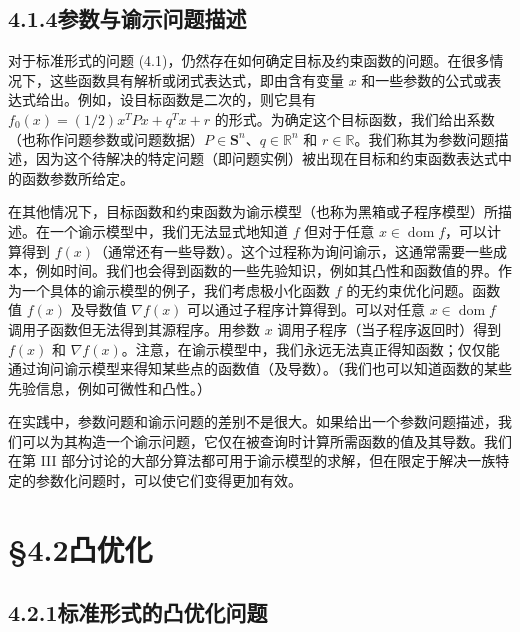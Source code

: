 \documentclass[UTF8, 12pt, fontset=fandol, oneside]{ctexart}
\begin{document}
\subsection*{4.1.4\quad 参数与谕示问题描述}

对于标准形式的问题 (4.1)，仍然存在如何确定目标及约束函数的问题。在很多情况下，这些函数具有解析或闭式表达式，即由含有变量 $x$ 和一些参数的公式或表达式给出。例如，设目标函数是二次的，则它具有 $f_0(x)=(1/2)x^TPx+q^Tx+r$ 的形式。为确定这个目标函数，我们给出系数（也称作问题参数或问题数据）$P\in\mathbf{S}^n$、$q\in\mathbb{R}^n$ 和 $r\in\mathbb{R}$。我们称其为参数问题描述，因为这个待解决的特定问题（即问题实例）被出现在目标和约束函数表达式中的函数参数所给定。

在其他情况下，目标函数和约束函数为谕示模型（也称为黑箱或子程序模型）所描述。在一个谕示模型中，我们无法显式地知道 $f$ 但对于任意 $x\in\operatorname{dom} f$，可以计算得到 $f(x)$（通常还有一些导数）。这个过程称为询问谕示，这通常需要一些成本，例如时间。我们也会得到函数的一些先验知识，例如其凸性和函数值的界。作为一个具体的谕示模型的例子，我们考虑极小化函数 $f$ 的无约束优化问题。函数值 $f(x)$ 及导数值 $\nabla f(x)$ 可以通过子程序计算得到。可以对任意 $x\in\operatorname{dom} f$ 调用子函数但无法得到其源程序。用参数 $x$ 调用子程序（当子程序返回时）得到 $f(x)$ 和 $\nabla f(x)$。注意，在谕示模型中，我们永远无法真正得知函数；仅仅能通过询问谕示模型来得知某些点的函数值（及导数）。（我们也可以知道函数的某些先验信息，例如可微性和凸性。）

在实践中，参数问题和谕示问题的差别不是很大。如果给出一个参数问题描述，我们可以为其构造一个谕示问题，它仅在被查询时计算所需函数的值及其导数。我们在第 III 部分讨论的大部分算法都可用于谕示模型的求解，但在限定于解决一族特定的参数化问题时，可以使它们变得更加有效。

\section*{§4.2\quad 凸优化}

\subsection*{4.2.1\quad 标准形式的凸优化问题}
\end{document}
